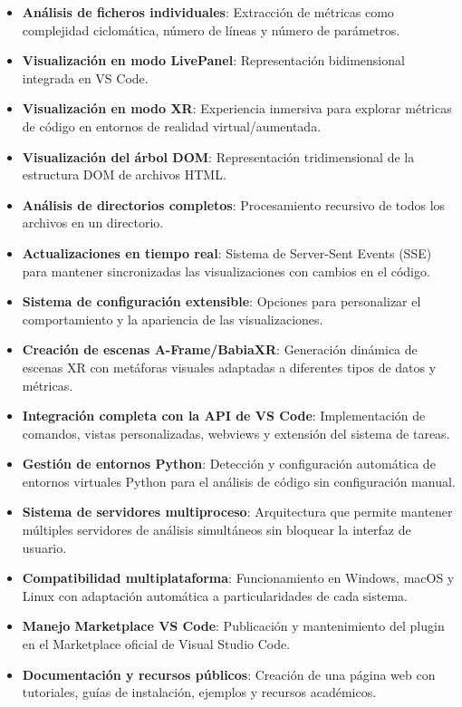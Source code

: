 \documentclass[a4paper, 12pt]{book}
\begin{document}
\begin{itemize}
  \item \textbf{Análisis de ficheros individuales}: Extracción de métricas como complejidad ciclomática, número de líneas y número de parámetros.
  
  \item \textbf{Visualización en modo LivePanel}: Representación bidimensional integrada en VS Code.
  
  \item \textbf{Visualización en modo XR}: Experiencia inmersiva para explorar métricas de código en entornos de realidad virtual/aumentada.
  
  \item \textbf{Visualización del árbol DOM}: Representación tridimensional de la estructura DOM de archivos HTML.
  
  \item \textbf{Análisis de directorios completos}: Procesamiento recursivo de todos los archivos en un directorio.
  
  \item \textbf{Actualizaciones en tiempo real}: Sistema de Server-Sent Events (SSE) para mantener sincronizadas las visualizaciones con cambios en el código.
  
  \item \textbf{Sistema de configuración extensible}: Opciones para personalizar el comportamiento y la apariencia de las visualizaciones.
  
  \item \textbf{Creación de escenas A-Frame/BabiaXR}: Generación dinámica de escenas XR con metáforas visuales adaptadas a diferentes tipos de datos y métricas.
  
  \item \textbf{Integración completa con la API de VS Code}: Implementación de comandos, vistas personalizadas, webviews y extensión del sistema de tareas.
  
  \item \textbf{Gestión de entornos Python}: Detección y configuración automática de entornos virtuales Python para el análisis de código sin configuración manual.
  
  \item \textbf{Sistema de servidores multiproceso}: Arquitectura que permite mantener múltiples servidores de análisis simultáneos sin bloquear la interfaz de usuario.
  
  \item \textbf{Compatibilidad multiplataforma}: Funcionamiento en Windows, macOS y Linux con adaptación automática a particularidades de cada sistema.
  
  \item \textbf{Manejo Marketplace VS Code}: Publicación y mantenimiento del plugin en el Marketplace oficial de Visual Studio Code.
  
  \item \textbf{Documentación y recursos públicos}: Creación de una página web con tutoriales, guías de instalación, ejemplos y recursos académicos.
  
\end{itemize}
\end{document}
